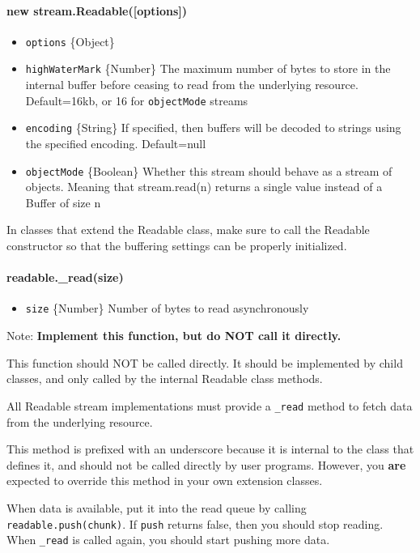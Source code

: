 \paragraph{new stream.Readable({[}options{]})}

\begin{itemize}
\item
  \texttt{options} \{Object\}
\item
  \texttt{highWaterMark} \{Number\} The maximum number of bytes to store
  in the internal buffer before ceasing to read from the underlying
  resource. Default=16kb, or 16 for \texttt{objectMode} streams
\item
  \texttt{encoding} \{String\} If specified, then buffers will be
  decoded to strings using the specified encoding. Default=null
\item
  \texttt{objectMode} \{Boolean\} Whether this stream should behave as a
  stream of objects. Meaning that stream.read(n) returns a single value
  instead of a Buffer of size n
\end{itemize}

In classes that extend the Readable class, make sure to call the
Readable constructor so that the buffering settings can be properly
initialized.

\paragraph{readable.\_read(size)}

\begin{itemize}
\item
  \texttt{size} \{Number\} Number of bytes to read asynchronously
\end{itemize}

Note: \textbf{Implement this function, but do NOT call it directly.}

This function should NOT be called directly. It should be implemented by
child classes, and only called by the internal Readable class methods.

All Readable stream implementations must provide a \texttt{\_read}
method to fetch data from the underlying resource.

This method is prefixed with an underscore because it is internal to the
class that defines it, and should not be called directly by user
programs. However, you \textbf{are} expected to override this method in
your own extension classes.

When data is available, put it into the read queue by calling
\texttt{readable.push(chunk)}. If \texttt{push} returns false, then you
should stop reading. When \texttt{\_read} is called again, you should
start pushing more data.


